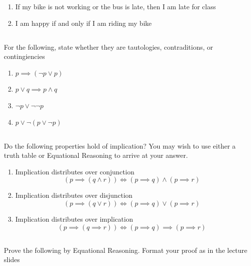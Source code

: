 \documentclass[twocolumn]{article}
\begin{document}
\begin{enumerate}
    \item If my bike is not working or the bus is late, then I am late for class
    \item I am happy if and only if I am riding my bike
\end{enumerate}

\subsection{}

For the following, state whether they are tautologies, contraditions, or contingiencies

\begin{enumerate}
    \item $p \implies (\neg p \vee p)$
    \item $p \vee q \implies p \wedge q$
    \item $\neg p \vee \neg\neg p$
    \item $p \vee \neg (p \vee \neg p) $
\end{enumerate}


\subsection{}

Do the following properties hold of implication? You may wish to use either a truth table or Equational Reasoning to arrive at your answer.

\begin{enumerate}
    \item Implication distributes over conjunction $$ (p \implies (q \wedge r)) \Longleftrightarrow (p \implies q) \wedge (p \implies r) $$
    \item Implication distributes over disjunction $$ (p \implies (q \vee r)) \Longleftrightarrow (p \implies q) \vee (p \implies r) $$
    \item Implication distributes over implication $$ (p \implies (q \implies r)) \Leftrightarrow (p \implies q) \implies (p \implies r) $$
\end{enumerate}

\subsection{}

Prove the following by Equational Reasoning. Format your proof as in the lecture slides
\end{document}
